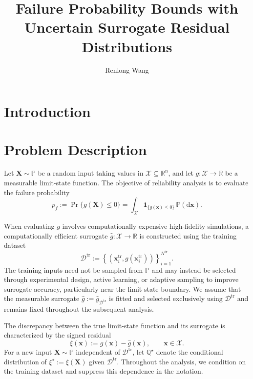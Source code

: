 \documentclass[review,11pt,3p,authoryear,nopreprintline]{elsarticle}
\begin{document}
\begin{frontmatter}
  \title{Failure Probability Bounds with Uncertain Surrogate Residual Distributions}

  \author[inst1]{Renlong Wang}

  \begin{abstract}
  \end{abstract}

  \begin{keyword}
  \end{keyword}
\end{frontmatter}

\section{Introduction}

\section{Problem Description}
\label{sec-problem} 

Let $\bm X\sim\mathbb P$ be a random input taking values in $\mathcal X\subseteq\mathbb R^n$, and let $g:\mathcal X\to\mathbb R$ be a measurable limit-state function. The objective of reliability analysis is to evaluate the failure probability
\[
  p_f:=\Pr\{g(\bm X)\le0\}=\int_{\mathcal X}\mathbf 1_{\{g(\bm x)\le0\}}\,\mathbb P(\mathrm d\bm x).
\]

When evaluating $g$ involves computationally expensive high-fidelity simulations, a computationally efficient surrogate $\hat g:\mathcal X\to\mathbb R$ is constructed using the training dataset
\[
  \mathcal D^{\mathrm{tr}}:=\left\{\left(\bm x_i^{\mathrm{tr}},g(\bm x_i^{\mathrm{tr}})\right)\right\}_{i=1}^{N^{\mathrm{tr}}}.
\]
The training inputs need not be sampled from $\mathbb P$ and may instead be selected through experimental design, active learning, or adaptive sampling to improve surrogate accuracy, particularly near the limit-state boundary. We assume that the measurable surrogate $\hat g:=\hat g_{\mathcal D^{\mathrm{tr}}}$ is fitted and selected exclusively using $\mathcal D^{\mathrm{tr}}$ and remains fixed throughout the subsequent analysis.

The discrepancy between the true limit-state function and its surrogate is characterized by the signed residual
\[
  \xi(\bm x):=g(\bm x)-\hat g(\bm x),\qquad \bm x\in\mathcal X.
\]
For a new input $\bm X\sim\mathbb P$ independent of $\mathcal D^{\mathrm{tr}}$, let $\mathbb Q^\star$ denote the conditional distribution of $\xi^\star:=\xi(\bm X)$ given $\mathcal D^{\mathrm{tr}}$. Throughout the analysis, we condition on the training dataset and suppress this dependence in the notation.
\end{document}
